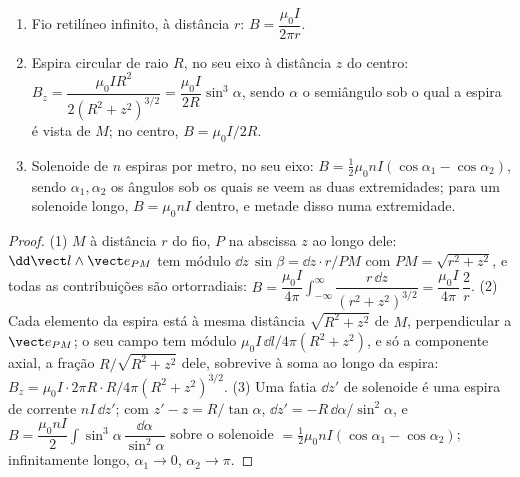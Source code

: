 \begin{proposition}\label{prop:b1:magnetostatics:three}
\begin{enumerate}
  \item Fio retilíneo infinito, à distância $r$: $B = \dfrac{\mu_0I}{2\pi r}$.
  \item Espira circular de raio $R$, no seu eixo à distância $z$ do
        centro: $B_z = \dfrac{\mu_0IR^2}{2(R^2 + z^2)^{3/2}} = \dfrac{\mu_0I}{2R}
        \sin^3\alpha$, sendo $\alpha$ o semiângulo sob o qual a espira é
        vista de $M$; no centro, $B = \mu_0I/2R$.
  \item Solenoide de $n$ espiras por metro, no seu eixo: $B = \tfrac12\mu_0nI
        (\cos\alpha_1 - \cos\alpha_2)$, sendo $\alpha_1, \alpha_2$ os ângulos sob
        os quais se veem as duas extremidades; para um solenoide longo, $B = \mu_0nI$
        dentro, e metade disso numa extremidade.
\end{enumerate}
\end{proposition}

\begin{proof}
(1) $M$ à distância $r$ do fio, $P$ na abscissa $z$ ao longo dele:
$\dd\vect l\wedge\vect e_{PM}$ tem módulo $\dd z\,\sin\beta = \dd z\cdot r/PM$
com $PM = \sqrt{r^2 + z^2}$, e todas as contribuições são ortorradiais:
$B = \dfrac{\mu_0I}{4\pi}\displaystyle\int_{-\infty}^{\infty}\dfrac{r\,\dd z}{(r^2 + z^2)^{3/2}}
= \dfrac{\mu_0I}{4\pi}\,\dfrac{2}{r}$. (2) Cada elemento da espira está à
mesma distância $\sqrt{R^2 + z^2}$ de $M$, perpendicular a
$\vect e_{PM}$; o seu campo tem módulo $\mu_0I\,\dd l/4\pi(R^2 + z^2)$, e
só a componente axial, a fração $R/\sqrt{R^2 + z^2}$ dele,
sobrevive à soma ao longo da espira: $B_z = \mu_0I\cdot2\pi R\cdot R/4\pi(R^2 +
z^2)^{3/2}$. (3) Uma fatia $\dd z'$ de solenoide é uma espira de corrente
$nI\,\dd z'$; com $z' - z = R/\tan\alpha$, $\dd z' = -R\,\dd\alpha/\sin^2\alpha$,
e $B = \dfrac{\mu_0nI}{2}\displaystyle\int\sin^3\alpha\,\dfrac{\dd\alpha}{\sin^2\alpha}$ sobre
o solenoide $= \tfrac12\mu_0nI(\cos\alpha_1 - \cos\alpha_2)$; infinitamente
longo, $\alpha_1 \to 0$, $\alpha_2 \to \pi$.
\end{proof}

